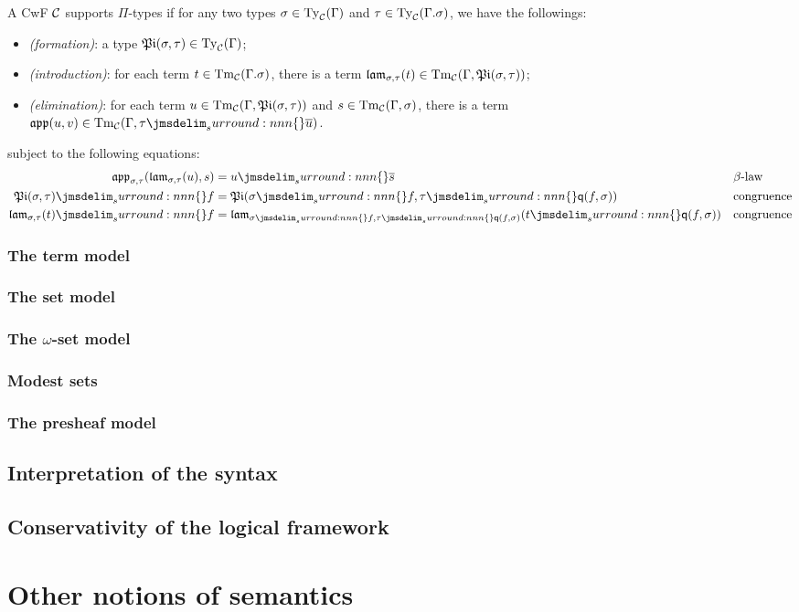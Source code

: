 \documentclass[a4paper]{article}
\begin{document}
\begin{definition}
  A CwF $\mathcal{C}$ supports $\Pi$-types if for any two types $\sigma \in \operatorname{Ty}_{\mathcal{C}}(\Gamma)$ and $\tau \in \operatorname{Ty}_{\mathcal{C}}(\Gamma.\sigma)$, we have the followings:
  \begin{itemize}
  \item \emph{(formation)}: a type $\operatorname{\mathfrak{Pi}}(\sigma,\tau) \in \operatorname{Ty}_{\mathcal{C}}(\Gamma)$;
  \item \emph{(introduction)}: for each term $t \in \operatorname{Tm}_{\mathcal{C}}(\Gamma.\sigma)$, there is a term $\operatorname{\mathfrak{lam}}_{\sigma,\tau}(t) \in \operatorname{Tm}_{\mathcal{C}}(\Gamma,\operatorname{\mathfrak{Pi}}(\sigma,\tau))$;
  \item \emph{(elimination)}: for each term $u \in \operatorname{Tm}_{\mathcal{C}}(\Gamma,\operatorname{\mathfrak{Pi}}(\sigma,\tau))$ and $s \in \operatorname{Tm}_{\mathcal{C}}(\Gamma,\sigma)$, there is a term $\app(u,v) \in \Tm{\cC}(\Gamma,\semSubst{\tau}{\overline{u}})$.
  \end{itemize}
  subject to the following equations:
  \begin{align*}
    \app_{\sigma,\tau}(\lam_{\sigma,\tau}(u),s) &= \semSubst{u}{\overline{s}}
    && \beta\text{-law}\\
    \semSubst{\typePi(\sigma,\tau)}{f} &= \typePi(\semSubst{\sigma}{f},\semSubst{\tau}{\ctxQ(f,\sigma)})
    && \text{congruence}\\
    \semSubst{\lam_{\sigma,\tau}(t)}{f} &= \lam_{\semSubst{\sigma}{f},\semSubst{\tau}{\ctxQ(f,\sigma)}}(\semSubst{t}{\ctxQ(f,\sigma)})
    && \text{congruence}\\
  \end{align*}
\end{definition}


\subsubsection{The term model}\label{sec:ttm}
\subsubsection{The set model}\label{sec:tsm}
\subsubsection{The $\omega$-set model}\label{sec:twsm}
\subsubsection{Modest sets}\label{sec:ms}
\subsubsection{The presheaf model}\label{sec:tpm}
\subsection{Interpretation of the syntax}\label{sec:iots}
\subsection{Conservativity of the logical framework}\label{sec:cotlf}
\section{Other notions of semantics}\label{sec:onos}



\end{document}
